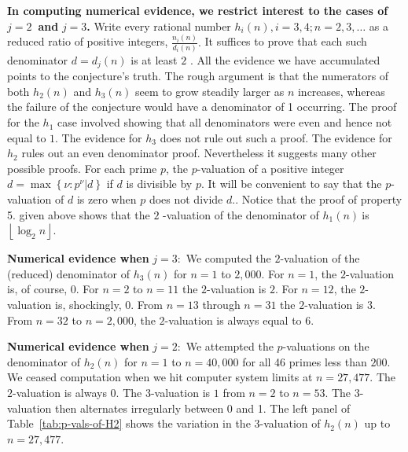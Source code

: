 \documentclass{article}
\begin{document}
\textbf{In computing numerical evidence, we restrict interest to the cases
of }$j=2$\textbf{\ and }$j=3$\textbf{.} Write every rational number $%
h_{i}\left( n\right) ,i=3,4;n=2,3,\dots $ as a reduced ratio of positive
integers, $\frac{n_{i}\left( n\right) }{d_{i}\left( n\right) }.$ It suffices
to prove that each such denominator $d=d_{j}\left( n\right) $ is at least $2$%
. All the evidence we have accumulated points to the conjecture's truth. The
rough argument is that the numerators of both $h_{2}\left( n\right) $ and $%
h_{3}\left( n\right) $ seem to grow steadily larger as $n$ increases,
whereas the failure of the conjecture would have a denominator of 1
occurring. The proof for the $h_{1}$ case involved showing that all
denominators were even and hence not equal to $1$. The evidence for $h_{3}$
does not rule out such a proof. The evidence for $h_{2}$ rules out an even
denominator proof. Nevertheless it suggests many other possible proofs. For
each prime $p$, the $p$-valuation of a positive integer $d=\max \left\{ \nu
:p^{\nu }|d\right\} $ if $d$ is divisible by $p.$ It will be convenient to
say that the $p$-valuation of $d$ is zero when $p$ does not divide $d.$.
Notice that the proof of property 5. given above shows that the $2$%
-valuation of the denominator of $h_{1}\left( n\right) \ $is $\left\lfloor
\log _{2}n\right\rfloor $.

\bigskip

\textbf{Numerical evidence when }$j=3:$ We computed the $2$-valuation
of the (reduced) denominator of $h_{3}\left( n\right) $ for $n=1$ to
$2,000$. For $n=1$, the $2$-valuation is, of course, $0$. For $n=2$ to
$n=11$ the $2$-valuation is $2$. For $n=12$, the $2$-valuation is, shockingly,
$0$. From $n=13$ through $n=31$ the $2$-valuation is $3$. From $n=32$ to
$n=2,000$, the $2$-valuation is always equal to $6$.

\bigskip

\textbf{Numerical evidence when }$j=2:$ We attempted the
$p$-valuations on the denominator of $h_{2}\left( n\right) $ for $n=1$
to $n=40,000$ for all 46 primes less than $200$. We ceased computation
when we hit computer system limits at $n=27,477.$ The $2$-valuation is
always $0$. The $3$-valuation is $%
1 $ from $n=2$ to $n=53$. The $3$-valuation then alternates
irregularly between 0 and 1. The left panel of
Table~\ref{tab:p-vals-of-H2} shows the variation in the
3-valuation of $h_{2}\left( n\right) $ up to $n=27,477$.

\end{document}
